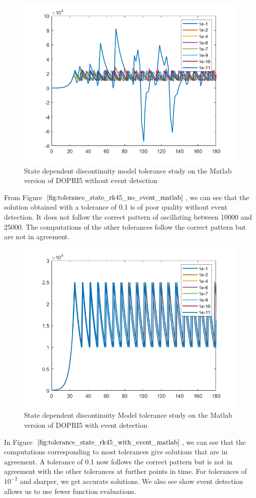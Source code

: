 \begin{figure}[h]
\centering
\includegraphics[width=0.7\linewidth]{./figures/tolerance_state_rk45_no_event_matlab}
\caption{State dependent discontinuity model tolerance study on the Matlab version of DOPRI5 without event detection}
\label{fig:tolerance_state_rk45_no_event_matlab}
\end{figure}

From Figure $\ref{fig:tolerance_state_rk45_no_event_matlab}$, we can see that the solution obtained with a tolerance of 0.1 is of poor quality without event detection. It does not follow the correct pattern of oscillating between 10000 and 25000. The computations of the other tolerances follow the correct pattern but are not in agreement.

\begin{figure}[h]
\centering
\includegraphics[width=0.7\linewidth]{./figures/tolerance_state_rk45_with_event_matlab}
\caption{State dependent discontinuity Model tolerance study on the Matlab version of DOPRI5 with event detection}
\label{fig:tolerance_state_rk45_with_event_matlab}
\end{figure}
In Figure $\ref{fig:tolerance_state_rk45_with_event_matlab}$, we can see that the computations corresponding to most tolerances give solutions that are in agreement. A tolerance of 0.1 now follows the correct pattern but is not in agreement with the other tolerances at further points in time. For tolerances of $10^{-2}$ and sharper, we get accurate solutions. We also see show event detection allows us to use fewer function evaluations.

